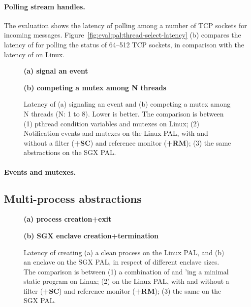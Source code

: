 \paragraph{Polling stream handles.}
The evaluation shows the latency of polling among a number of TCP sockets for incoming messages.
Figure~\ref{fig:eval:pal:thread-select-latency} (b)
compares the latency of
 for polling the status
of 64--512 TCP sockets,
in comparison with the latency of  on Linux.






\begin{figure*}[t!]
\centering
\footnotesize
{}
\parbox{0.49\textwidth}{\centering\bf (a) signal an event}
\parbox{0.49\textwidth}{\centering\bf (b) competing a mutex among N threads}
\caption{Latency of (a) signaling an event and (b) competing a mutex among N threads (N: 1 to 8).
Lower is better.
The comparison is between (1) pthread condition variables and mutexes on Linux; (2) Notification events and mutexes on the Linux PAL, with and without a \seccomp{} filter ({\bf +SC}) and reference monitor ({\bf +RM}); (3) the same abstractions on the SGX PAL.}
\label{fig:eval:pal:sched-latency}
\end{figure*}



\paragraph{Events and mutexes.}


\subsection{Multi-process abstractions}
\label{sec:eval:pal:multi-proc}

\begin{figure*}[t!]
\centering
\footnotesize
{}
\parbox{0.59\textwidth}{\centering\bf (a) process creation+exit}
\parbox{0.39\textwidth}{\centering\bf (b) SGX enclave creation+termination}
\caption{Latency of creating (a) a clean process on the Linux PAL, and (b) an enclave on the SGX PAL, in respect of different enclave sizes.
The comparison is between (1) a combination of  and 'ing a minimal static program on Linux; (2)  on the Linux PAL, with and without a \seccomp{} filter ({\bf +SC}) and reference monitor ({\bf +RM}); (3) the same \hostapi{} on the SGX PAL.}
\label{fig:eval:pal:proc-latency}
\end{figure*}

